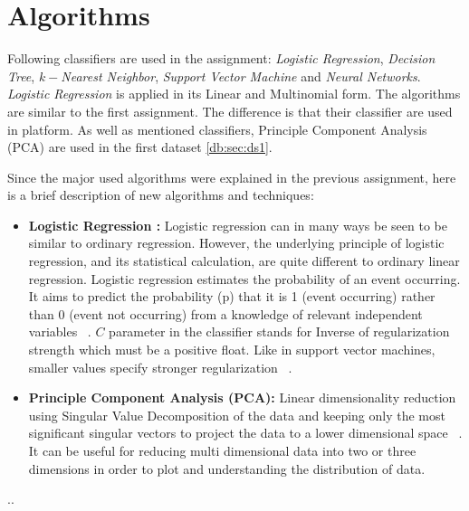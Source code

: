 \section{Algorithms}
Following classifiers are used in the assignment:  \textit{Logistic
Regression}, \textit{Decision Tree}, \textit{$k-$Nearest Neighbor}, \textit{Support Vector Machine} and \textit{Neural Networks}. \textit{Logistic Regression} is applied in its Linear and Multinomial form. The algorithms are similar to the first assignment. The difference is that their classifier are used in platform. As well as mentioned classifiers, Principle Component Analysis (PCA) are used in the first dataset \ref{db:sec:ds1}.

Since the major used algorithms were explained in the previous assignment, here is a brief description of new algorithms and techniques:

\begin{itemize}
\item \textbf{Logistic Regression :} Logistic regression can in many ways be seen to be similar to ordinary regression. However, the underlying principle of logistic regression, and its statistical calculation, are quite different to ordinary linear regression.  Logistic regression estimates the probability of an event occurring. It aims to predict the probability (p) that it is 1 (event occurring) rather than 0 (event not occurring) from a knowledge of relevant independent variables ~\cite{alg:logreg-def}. $C$ parameter in the classifier stands for Inverse of regularization strength which must be a positive float. Like in support vector machines, smaller values specify stronger regularization ~\cite{alg:logreg}.

\item \textbf{Principle Component Analysis (PCA):} Linear dimensionality reduction using Singular Value Decomposition of the data and keeping only the most significant singular vectors to project the data to a lower dimensional space  ~\cite{alg:pca}. It can be useful for reducing multi dimensional data into two or three dimensions in order to plot and understanding the distribution of data.
\end{itemize}
..